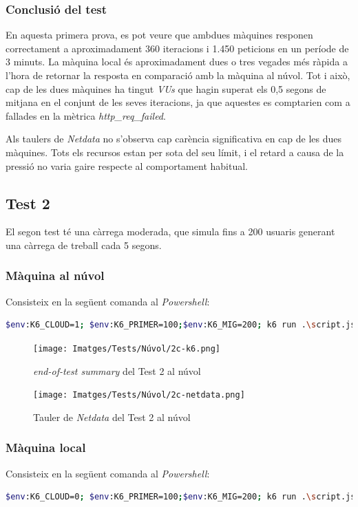 \subsubsection{Conclusió del test}

En aquesta primera prova, es pot veure que ambdues màquines responen correctament a aproximadament 360 iteracions i 1.450 peticions en un període de 3 minuts. La màquina local és aproximadament dues o tres vegades més ràpida a l'hora de retornar la resposta en comparació amb la màquina al núvol. Tot i això, cap de les dues màquines ha tingut \textit{VUs} que hagin superat els 0,5 segons de mitjana en el conjunt de les seves iteracions, ja que aquestes es comptarien com a fallades en la mètrica \textit{http\_req\_failed}.

Als taulers de \textit{Netdata} no s'observa cap carència significativa en cap de les dues màquines. Tots els recursos estan per sota del seu límit, i el retard a causa de la pressió no varia gaire respecte al comportament habitual.

\newpage
\subsection{Test 2}

El segon test té una càrrega moderada, que simula fins a 200 usuaris generant una càrrega de treball cada 5 segons.

\subsubsection{Màquina al núvol}
Consisteix en la següent comanda al \textit{Powershell}:
\begin{lstlisting}[language=bash, caption=Test 2 al núvol]
    $env:K6_CLOUD=1; $env:K6_PRIMER=100;$env:K6_MIG=200; k6 run .\script.js
\end{lstlisting}

\begin{figure}[!htbp]
    \texttt{[image: Imatges/Tests/Núvol/2c-k6.png]}  
    \caption{\textit{end-of-test summary} del Test 2 al núvol}
\end{figure}

\begin{figure}[!htbp]
    \texttt{[image: Imatges/Tests/Núvol/2c-netdata.png]}  
    \caption{Tauler de \textit{Netdata} del Test 2 al núvol}
\end{figure}

\subsubsection{Màquina local}
Consisteix en la següent comanda al \textit{Powershell}:
\begin{lstlisting}[language=bash, caption=Test 2 local]
    $env:K6_CLOUD=0; $env:K6_PRIMER=100;$env:K6_MIG=200; k6 run .\script.js
\end{lstlisting}

